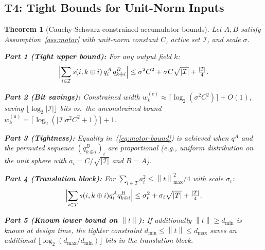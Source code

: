\documentclass[11pt,a4paper]{article}
\theoremstyle{definition}
\theoremstyle{plain}
\newtheorem{theorem}{Theorem}[section]
\theoremstyle{remark}
\newcommand{\norm}[1]{\left\|#1\right\|}
\begin{document}
\subsection{T4: Tight Bounds for Unit-Norm Inputs}
\label{sec:constrained}

\begin{theorem}[Cauchy-Schwarz constrained accumulator bounds]
\label{thm:constrained}
Let $A,B$ satisfy Assumption~\ref{ass:motor} with unit-norm constant $C$,
active set $\mathcal{I}$, and scale $\sigma$.

\textbf{Part 1 (Tight upper bound):}
For any output field $k$:
\begin{equation}\label{eq:motor-bound}
  \Bigl|\sum_{i\in\mathcal{I}} s(i,k\oplus i)\,q_i^A\,q_{k\oplus i}^B\Bigr|
  \le \sigma^2C^2 + \sigma C\sqrt{|\mathcal{I}|} + \tfrac{|\mathcal{I}|}{4}.
\end{equation}

\textbf{Part 2 (Bit savings):}
Constrained width $w_k^{(\mathrm{c})} \approx \lceil\log_2(\sigma^2C^2)\rceil+O(1)$,
saving $\lfloor\log_2|\mathcal{I}|\rfloor$ bits vs.\ the unconstrained
bound $w_k^{(\mathrm{u})}=\lceil\log_2(|\mathcal{I}|\sigma^2C^2+1)\rceil+1$.

\textbf{Part 3 (Tightness):}
Equality in~(\ref{eq:motor-bound}) is achieved when $q^A$ and the
permuted sequence $(q_{k\oplus i}^B)_i$ are proportional (e.g.,
uniform distribution on the unit sphere with $a_i=C/\sqrt{|\mathcal{I}|}$
and $B=A$).

\textbf{Part 4 (Translation block):}
For $\sum_{i\in T}a_i^2\le\norm{t}^2_{\max}/4$ with scale $\sigma_t$:
\begin{equation}\label{eq:trans-bound}
  \Bigl|\sum_{i\in T}s(i,k\oplus i)q_i^Aq_{k\oplus i}^B\Bigr|
  \le \sigma_t^2 + \sigma_t\sqrt{|T|} + \tfrac{|T|}{4}.
\end{equation}

\textbf{Part 5 (Known lower bound on $\norm{t}$):}
If additionally $\norm{t}\ge d_{\min}$ is known at design time,
the tighter constraint $d_{\min}\le\norm{t}\le d_{\max}$ saves an
additional $\lfloor\log_2(d_{\max}/d_{\min})\rfloor$ bits in the
translation block.
\end{theorem}
\end{document}
